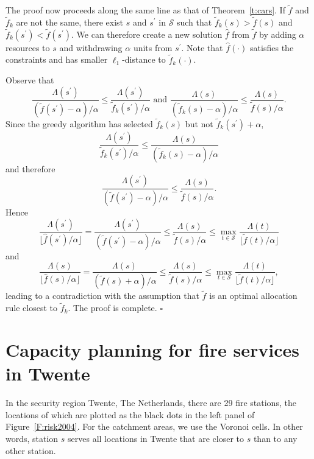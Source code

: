 \documentclass[twoside,11pt]{article}
\newenvironment{proof}[1]{\noindent{\em Proof{#1}:}}{\hfill $\square$ \\}
\begin{document}
\begin{proof}{}
The proof now proceeds along the same line as that of 
Theorem~\ref{t:cars}. If $\tilde f$ and $\tilde f_k$ are not 
the same, there exist $s$ and $s^\prime$ in $\mathcal{S}$
such that $\tilde f_k(s) > \tilde f(s)$ and 
$\tilde f_k(s^\prime) < \tilde f(s^\prime)$. 
We can therefore create a new solution $\hat f$ from 
$\tilde f$ by adding $\alpha$ resources to $s$ and 
withdrawing $\alpha$ units from $s^\prime$. Note that 
$\hat f(\cdot)$ satisfies the constraints and has
smaller $\ell_1$-distance to $\tilde f_k(\cdot)$.  

Observe that
\[
\frac{\Lambda(s^\prime)}
    { ( \tilde f(s^\prime)-\alpha) / \alpha }
    \leq \frac{\Lambda(s^\prime)}
     { \tilde f_k(s^\prime) / \alpha }
\mbox{ and }
   \frac{\Lambda(s)}
   { (\tilde f_k(s) -\alpha)/ \alpha}
   \leq  \frac{\Lambda(s)}
    {\tilde f(s) / \alpha }.
\]
Since the greedy algorithm has selected $\tilde f_k(s)$ but not
$\tilde f_k(s^\prime) + \alpha$,
\[
\frac{\Lambda(s^\prime)}
    { \tilde f_k(s^\prime) / \alpha  }
     \leq  \frac{\Lambda(s)}
    { (\tilde f_k(s) - \alpha)/ \alpha  }
\]
and therefore
\[
\frac{\Lambda(s^\prime)}
    {  ( \tilde f(s^\prime)-\alpha) / \alpha  }
    \leq \frac{\Lambda(s)}
    {  \tilde f(s) / \alpha  }.
\]
Hence 
\[
\frac{\Lambda(s^\prime)}
    { \lfloor \hat f(s^\prime) / \alpha \rfloor } =
\frac{\Lambda(s^\prime)}
    {  ( \tilde f(s^\prime)-\alpha) / \alpha } \leq 
    \frac{\Lambda(s)}
    {  \tilde f(s) / \alpha }
    \leq \max_{t\in \mathcal{S}} \frac{\Lambda(t)}
    { \lfloor \tilde f(t) / \alpha \rfloor }
\]
and
\[
\frac{\Lambda(s)}
    { \lfloor \hat f(s) / \alpha \rfloor } =
\frac{\Lambda(s)}
    {  ( \tilde f(s)+ \alpha) / \alpha} \leq 
    \frac{\Lambda(s)}
    {  \tilde f(s) / \alpha }
    \leq \max_{t\in \mathcal{S}} \frac{\Lambda(t)}
    { \lfloor \tilde f(t) / \alpha \rfloor },
\]
leading to a contradiction with the assumption that $\tilde f$
is an optimal allocation rule closest to $\tilde f_k$. The proof is complete.
\end{proof}

\section{Capacity planning for fire services in Twente}
\label{S:Twente}

In the security region Twente, The Netherlands, there are 
29 fire stations, the locations of which are plotted as the 
black dots in the left panel of Figure~\ref{F:risk2004}. 
For the catchment areas, we use the Voronoi cells. In other
words, station $s$ serves all locations in Twente that are 
closer to $s$ than to any other station. 
\end{document}
